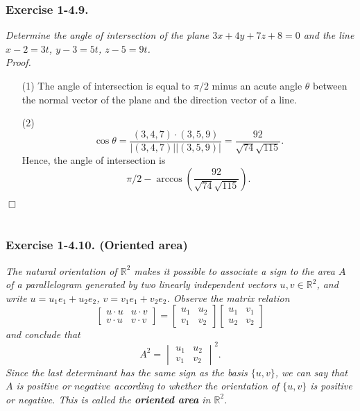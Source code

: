 \documentclass{article}
\begin{document}
\subsubsection*{Exercise 1-4.9.}
\emph{Determine the angle of intersection of the plane $3x+4y+7z+8=0$ and
the line $x-2=3t$, $y-3=5t$, $z-5=9t$.} \\



\emph{Proof.}
\begin{enumerate}
\item[(1)]
  The angle of intersection is equal to $\pi/2$ minus an acute angle $\theta$ between
  the normal vector of the plane and the direction vector of a line.

\item[(2)]
  \[
    \cos\theta
    = \frac{(3,4,7) \cdot (3,5,9)}{|(3,4,7)||(3,5,9)|}
    = \frac{92}{\sqrt{74}\sqrt{115}}.
  \]
  Hence, the angle of intersection is
  \[
    \pi/2 - \arccos\left( \frac{92}{\sqrt{74}\sqrt{115}} \right).
  \]
\end{enumerate}
$\Box$ \\\\






\subsubsection*{Exercise 1-4.10. (Oriented area)}
\emph{The natural orientation of $\mathbb{R}^2$
makes it possible to associate a sign to the area $A$
of a parallelogram generated by two linearly independent vectors $u, v \in \mathbb{R}^2$,
and write $u = u_1 e_1 + u_2 e_2$, $v = v_1 e_1 + v_2 e_2$.
Observe the matrix relation
\[
  \begin{bmatrix}
    u \cdot u & u \cdot v \\
    v \cdot u & v \cdot v
  \end{bmatrix}
  =
  \begin{bmatrix}
    u_1 & u_2 \\
    v_1 & v_2
  \end{bmatrix}
  \begin{bmatrix}
    u_1 & v_1 \\
    u_2 & v_2
  \end{bmatrix}
\]
and conclude that
\[
  A^2
  =
  \begin{vmatrix}
    u_1 & u_2 \\
    v_1 & v_2
  \end{vmatrix}^2.
\]
Since the last determinant has the same sign as the basis $\{u,v\}$,
we can say that $A$ is positive or $negative$ according to whether
the orientation of $\{u,v\}$ is positive or negative.
This is called the \textbf{oriented area} in $\mathbb{R}^2$.} \\
\end{document}
